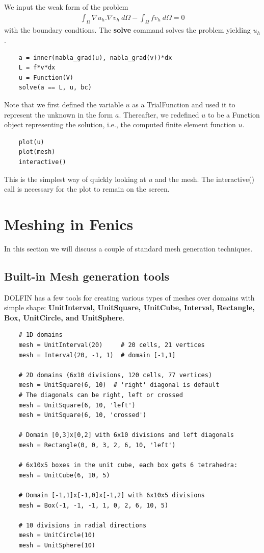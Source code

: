 We input the weak form of the problem 
\begin{eqnarray}
	 \int_{\Omega} \nabla u_h. \nabla v_h \ d\Omega - \int_{\Omega} f v_h \ d\Omega = 0
\end{eqnarray}
with the boundary condtions. The \textbf{solve} command solves the problem yielding $u_h$. 
\begin{lstlisting}
	a = inner(nabla_grad(u), nabla_grad(v))*dx
	L = f*v*dx
	u = Function(V)
	solve(a == L, u, bc)
\end{lstlisting}
Note that we first defined the variable $u$ as a TrialFunction and used it to represent the unknown in the form $a$. Thereafter, we redefined $u$ to be a Function object representing the solution, i.e., the computed finite element function $u$.
\begin{lstlisting}
	plot(u)
	plot(mesh)
	interactive()
\end{lstlisting}
This is the simplest way of quickly looking at $u$ and the mesh. The interactive() call is necessary for the plot to remain on the screen.

\pagebreak

\section{Meshing in Fenics}
In this section we will discuss a couple of standard mesh generation techniques.
\subsection{Built-in Mesh generation tools}
DOLFIN has a few tools for creating various types of meshes over domains with simple shape: \textbf{UnitInterval, UnitSquare, UnitCube, Interval, Rectangle, Box, UnitCircle, and UnitSphere}.
\begin{lstlisting}
	# 1D domains
	mesh = UnitInterval(20)     # 20 cells, 21 vertices
	mesh = Interval(20, -1, 1)  # domain [-1,1]

	# 2D domains (6x10 divisions, 120 cells, 77 vertices)
	mesh = UnitSquare(6, 10)  # 'right' diagonal is default
	# The diagonals can be right, left or crossed
	mesh = UnitSquare(6, 10, 'left')
	mesh = UnitSquare(6, 10, 'crossed')

	# Domain [0,3]x[0,2] with 6x10 divisions and left diagonals
	mesh = Rectangle(0, 0, 3, 2, 6, 10, 'left')

	# 6x10x5 boxes in the unit cube, each box gets 6 tetrahedra:
	mesh = UnitCube(6, 10, 5)

	# Domain [-1,1]x[-1,0]x[-1,2] with 6x10x5 divisions
	mesh = Box(-1, -1, -1, 1, 0, 2, 6, 10, 5)

	# 10 divisions in radial directions
	mesh = UnitCircle(10)
	mesh = UnitSphere(10)
\end{lstlisting}

